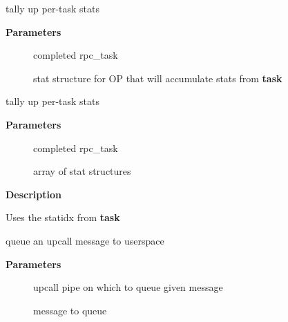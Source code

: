 \documentclass[a4paper,8pt,english]{sphinxmanual}
\begin{document}
\begin{fulllineitems}
\label{networking/kapi:c.rpc_count_iostats_metrics}
tally up per-task stats

\end{fulllineitems}


\textbf{Parameters}
\begin{description}
\item[{}] \leavevmode
completed rpc\_task

\item[{}] \leavevmode
stat structure for OP that will accumulate stats from \textbf{task}

\end{description}

\begin{fulllineitems}
\label{networking/kapi:c.rpc_count_iostats}
tally up per-task stats

\end{fulllineitems}


\textbf{Parameters}
\begin{description}
\item[{}] \leavevmode
completed rpc\_task

\item[{}] \leavevmode
array of stat structures

\end{description}

\textbf{Description}

Uses the statidx from \textbf{task}

\begin{fulllineitems}
\label{networking/kapi:c.rpc_queue_upcall}
queue an upcall message to userspace

\end{fulllineitems}


\textbf{Parameters}
\begin{description}
\item[{}] \leavevmode
upcall pipe on which to queue given message

\item[{}] \leavevmode
message to queue

\end{description}
\end{document}
